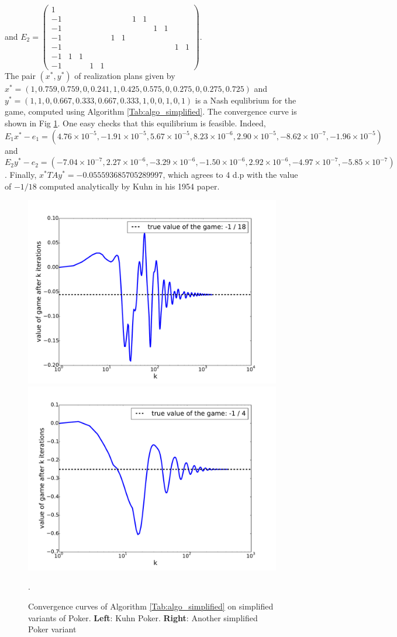 \documentclass{article} %
\begin{document}
and $E_2 = \left(\begin{array}{ccccccccccccc}
1 &   &   &   &   &   &   &   &   &   &   &   &  \\
-1 &   &   &   &   &   &   & 1 & 1 &   &   &   &  \\
-1 &   &   &   &   &   &   &   &   & 1 & 1 &   &  \\
-1 &   &   &   &   & 1 & 1 &   &   &   &   &   &  \\
-1 &   &   &   &   &   &   &   &   &   &   & 1 & 1\\
-1 & 1 & 1 &   &   &   &   &   &   &   &   &   &  \\
-1 &   &   & 1 & 1 &   &   &   &   &   &   &   &  
\end{array}\right)$.\\
The pair $(x^*, y^*)$ of realization plans given by\\
$x^* = (1, 0.759, 0.759, 0, 0.241, 1, 0.425, 0.575, 0, 0.275, 0, 0.275, 0.725)$ and
$y^* = (1, 1, 0, 0.667, 0.333, 0.667, 0.333, 1, 0, 0, 1, 0, 1)$ is a Nash equlibrium for the game, computed using Algorithm  \ref{Tab:algo_simplified}. The convergence curve is shown in Fig \ref{Tab:conv_curves}. One easy checks that this equilibrium is feasible. Indeed,  $E_1x^* - e_1 = (4.76 \times 10^{-5}, -1.91 \times 10^{-5}, 5.67 \times 10^{-5}, 8.23 \times 10^{-6}, 2.90 \times 10^{-5}, -8.62 \times 10^{-7}, -1.96 \times 10^{-5})$ and $E_2y^* - e_2 = (-7.04 \times 10^{-7}, 2.27 \times 10^{-6}, -3.29 \times 10^{-6}, -1.50 \times 10^{-6}, 2.92 \times 10^{-6}, -4.97 \times 10^{-7}, -5.85 \times 10^{-7})$. Finally, $x^*TAy^* = -0.055593685705289997$, which agrees to 4 d.p with the value of $-1 / 18$ computed analytically by Kuhn in his 1954 paper.

\begin{figure}
  \includegraphics[width=.5\linewidth]{Kuhn3112_NE.pdf}
  \includegraphics[width=.5\linewidth]{SimplifiedPoker_NE.pdf}
  \caption{Convergence curves of Algorithm \ref{Tab:algo_simplified} on simplified variants of Poker. \textbf{Left}: Kuhn Poker. \textbf{Right}: Another simplified Poker variant}.
  \label{Tab:conv_curves}
\end{figure}

\small


\end{document}
